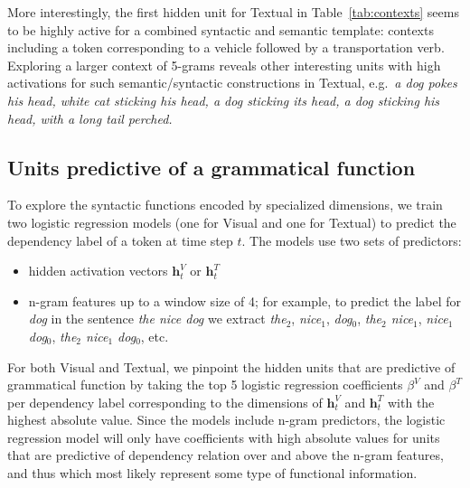 More interestingly, the first hidden unit  for {\sc Textual} in  Table~\ref{tab:contexts}
seems to be highly active for a combined syntactic and semantic template:
contexts including a token corresponding to a vehicle followed by a transportation verb.
Exploring a larger context of 5-grams reveals other interesting units 
with high activations for such semantic/syntactic constructions in {\sc Textual}, e.g.\
{\it a dog pokes his head, white cat sticking his head, a dog sticking its head, a dog 
sticking his head, with a long tail perched.} 

\subsection{Units predictive of a grammatical function}
\label{sec:syntacticdim}

To explore the syntactic functions encoded by specialized dimensions,
we train two logistic regression models (one for {\sc Visual} and one
for {\sc Textual}) to predict the dependency label of a token at time
step $t$. The models use two sets of predictors:
\begin{itemize}
  \item hidden activation vectors $\mathbf{h}_t^V$ or $\mathbf{h}_t^T$
  \item n-gram features up to a window size of 4; for example, to predict the label for {\it dog} in the sentence {\it the nice dog} we extract {\it the}$_2$, {\it nice}$_1$, {\it dog}$_0$, {\it the$_2$ nice$_1$}, {\it nice$_1$ dog$_0$}, {\it the$_2$ nice$_1$ dog$_0$}, etc.
\end{itemize}

For both {\sc Visual} and {\sc Textual}, we pinpoint the hidden units
that are predictive of grammatical function by taking the top 5
logistic regression coefficients $\beta^V$ and $\beta^T$ per
dependency label corresponding to the dimensions of $\mathbf{h}^V_t$
and $\mathbf{h}^T_t$ with the highest absolute value. Since the models
include n-gram predictors, the logistic regression model will only
have coefficients with high absolute values for units that are
predictive of dependency relation over and above the n-gram features,
and thus which most likely represent some type of functional
information. 

